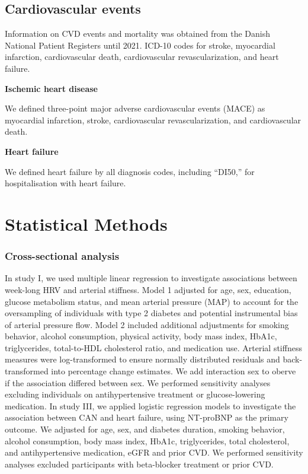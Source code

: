 \documentclass[
  a4paper,
  headsepline=true,
  open=any]{scrbook}
\begin{document}
\hypertarget{cardiovascular-events}{%
\section{Cardiovascular events}\label{cardiovascular-events}}

Information on CVD events and mortality was obtained from the Danish
National Patient Registers until 2021. ICD-10 codes for stroke,
myocardial infarction, cardiovascular death, cardiovascular
revascularization, and heart failure.

\textbf{Ischemic heart disease}

We defined three-point major adverse cardiovascular events (MACE) as
myocardial infarction, stroke, cardiovascular revascularization, and
cardiovascular death.

\textbf{Heart failure}

We defined heart failure by all diagnosis codes, including ``DI50,'' for
hospitalisation with heart failure.


\hypertarget{statistical-methods}{%
\chapter{Statistical Methods}\label{statistical-methods}}

\hypertarget{cross-sectional-analysis}{%
\subsection{Cross-sectional analysis}\label{cross-sectional-analysis}}

In study I, we used multiple linear regression to investigate
associations between week-long HRV and arterial stiffness. Model 1
adjusted for age, sex, education, glucose metabolism status, and mean
arterial pressure (MAP) to account for the oversampling of individuals
with type 2 diabetes and potential instrumental bias of arterial
pressure flow. Model 2 included additional adjustments for smoking
behavior, alcohol consumption, physical activity, body mass index,
HbA1c, triglycerides, total-to-HDL cholesterol ratio, and medication
use. Arterial stiffness measures were log-transformed to ensure normally
distributed residuals and back-transformed into percentage change
estimates. We add interaction sex to oberve if the association differed
between sex. We performed sensitivity analyses excluding individuals on
antihypertensive treatment or glucose-lowering medication. In study III,
we applied logistic regression models to investigate the association
between CAN and heart failure, using NT-proBNP as the primary outcome.
We adjusted for age, sex, and diabetes duration, smoking behavior,
alcohol consumption, body mass index, HbA1c, triglycerides, total
cholesterol, and antihypertensive medication, eGFR and prior CVD. We
performed sensitivity analyses excluded participants with beta-blocker
treatment or prior CVD.
\end{document}
